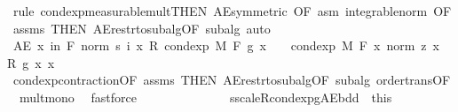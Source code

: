\begin{isabellebody}
\ {\isacharparenleft}{\kern0pt}rule\ cond{\isacharunderscore}{\kern0pt}exp{\isacharunderscore}{\kern0pt}measurable{\isacharunderscore}{\kern0pt}mult{\isacharparenleft}{\kern0pt}{}{\isacharparenright}{\kern0pt}{\isacharbrackleft}{\kern0pt}THEN\ AE{\isacharunderscore}{\kern0pt}symmetric{\isacharcomma}{\kern0pt}\ OF\ asm\ integrable{\isacharunderscore}{\kern0pt}norm{\isacharcomma}{\kern0pt}\ OF\ assms{\isacharparenleft}{\kern0pt}{}{\isacharparenright}{\kern0pt}{\isacharcomma}{\kern0pt}\ THEN\ AE{\isacharunderscore}{\kern0pt}restr{\isacharunderscore}{\kern0pt}to{\isacharunderscore}{\kern0pt}subalg{}{\isacharbrackleft}{\kern0pt}OF\ subalg{\isacharbrackright}{\kern0pt}{\isacharbrackright}{\kern0pt}{\isacharcomma}{\kern0pt}\ auto{\isacharparenright}{\kern0pt}\isanewline
\ \ \ \ \ \ \ \ \isamarkupfalse%
\ \isamarkupfalse%
\ {\isachardoublequoteopen}AE\ x\ in\ {\isacharquery}{\kern0pt}F{\isachardot}{\kern0pt}\ norm\ {\isacharparenleft}{\kern0pt}s\ i\ x\ {\isacharasterisk}{\kern0pt}\isactrlsub R\ cond{\isacharunderscore}{\kern0pt}exp\ M\ F\ g\ x{\isacharparenright}{\kern0pt}\ {\isasymle}\ {}\ {\isacharasterisk}{\kern0pt}\ cond{\isacharunderscore}{\kern0pt}exp\ M\ F\ {\isacharparenleft}{\kern0pt}{\isasymlambda}x{\isachardot}{\kern0pt}\ norm\ {\isacharparenleft}{\kern0pt}z\ x\ {\isacharasterisk}{\kern0pt}\isactrlsub R\ g\ x{\isacharparenright}{\kern0pt}{\isacharparenright}{\kern0pt}\ x{\isachardoublequoteclose}\ \isamarkupfalse%
\ cond{\isacharunderscore}{\kern0pt}exp{\isacharunderscore}{\kern0pt}contraction{\isacharbrackleft}{\kern0pt}OF\ assms{\isacharparenleft}{\kern0pt}{}{\isacharparenright}{\kern0pt}{\isacharcomma}{\kern0pt}\ THEN\ AE{\isacharunderscore}{\kern0pt}restr{\isacharunderscore}{\kern0pt}to{\isacharunderscore}{\kern0pt}subalg{}{\isacharbrackleft}{\kern0pt}OF\ subalg{\isacharbrackright}{\kern0pt}{\isacharbrackright}{\kern0pt}\ order{\isacharunderscore}{\kern0pt}trans{\isacharbrackleft}{\kern0pt}OF\ {\isacharunderscore}{\kern0pt}\ mult{\isacharunderscore}{\kern0pt}mono{\isacharbrackright}{\kern0pt}\ \isamarkupfalse%
\ fastforce\isanewline
\ \ \ \ \ \ \isacommand{{\isacharbraceright}{\kern0pt}}\isamarkupfalse%
\isanewline
\ \ \ \ \ \ \isamarkupfalse%
\ s{\isacharunderscore}{\kern0pt}scaleR{\isacharunderscore}{\kern0pt}cond{\isacharunderscore}{\kern0pt}exp{\isacharunderscore}{\kern0pt}g{\isacharunderscore}{\kern0pt}AE{\isacharunderscore}{\kern0pt}bdd\ {\isacharequal}{\kern0pt}\ this\isanewline
\isanewline

\end{isabellebody}
